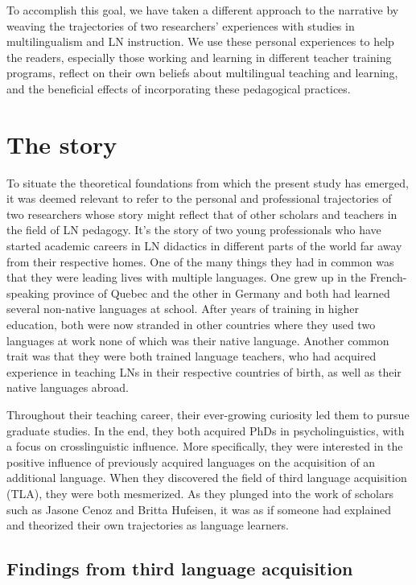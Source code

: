 \documentclass[output=paper]{../langscibook}
\begin{document}
To accomplish this goal, we have taken a different approach to the narrative by weaving the trajectories of two researchers’ experiences with studies in multilingualism and LN instruction. We use these personal experiences to help the readers, especially those working and learning in different teacher training programs, reflect on their own beliefs about multilingual teaching and learning, and the beneficial effects of incorporating these pedagogical practices.


\section{The story}


To situate the theoretical foundations from which the present study has emerged, it was deemed relevant to refer to the personal and professional trajectories of two researchers whose story might reflect that of other scholars and teachers in the field of LN pedagogy. It’s the story of two young professionals who have started academic careers in LN didactics in different parts of the world far away from their respective homes. One of the many things they had in common was that they were leading lives with multiple languages. One grew up in the French-speaking province of Quebec and the other in Germany and both had learned several non-native languages at school. After years of training in higher education, both were now stranded in other countries where they used two languages at work none of which was their native language. Another common trait was that they were both trained language teachers, who had acquired experience in teaching LNs in their respective countries of birth, as well as their native languages abroad. 

Throughout their teaching career, their ever-growing curiosity led them to pursue graduate studies. In the end, they both acquired PhDs in psycholinguistics, with a focus on crosslinguistic influence. More specifically, they were interested in the positive influence of previously acquired languages on the acquisition of an additional language. When they discovered the field of third language acquisition (TLA), they were both mesmerized. As they plunged into the work of scholars such as Jasone Cenoz and Britta Hufeisen, it was as if someone had explained and theorized their own trajectories as language learners.



\subsection{Findings from third language acquisition}
\end{document}
